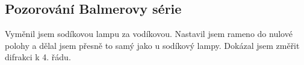 \documentclass{article}
\begin{document}
\subsection{Pozorování Balmerovy série}
Vyměnil jsem sodíkovou lampu za vodíkovou.
Nastavil jsem rameno do nulové polohy a dělal jsem přesně to samý jako u sodíkový lampy.
Dokázal jsem změřit difrakci k 4. řádu.
\section{}
\section{}
\section{}
\section{}
\section{}
\end{document}
